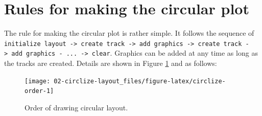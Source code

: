 \documentclass[]{book}
\theoremstyle{definition}
\theoremstyle{definition}
\theoremstyle{remark}
\begin{document}
\section{Rules for making the circular
plot}\label{rules-for-making-the-circular-plot}

The rule for making the circular plot is rather simple. It follows the
sequence of
\texttt{initialize\ layout\ -\textgreater{}\ create\ track\ -\textgreater{}\ add\ graphics\ -\textgreater{}\ create\ track\ -\textgreater{}\ add\ graphics\ -\ ...\ -\textgreater{}\ clear}.
Graphics can be added at any time as long as the tracks are created.
Details are shown in Figure \ref{fig:circlize-order} and as follows:

\begin{figure}

{\centering \texttt{[image: 02-circlize-layout\_files/figure-latex/circlize-order-1]} 

}

\caption{Order of drawing circular layout.}\label{fig:circlize-order}
\end{figure}
\end{document}
